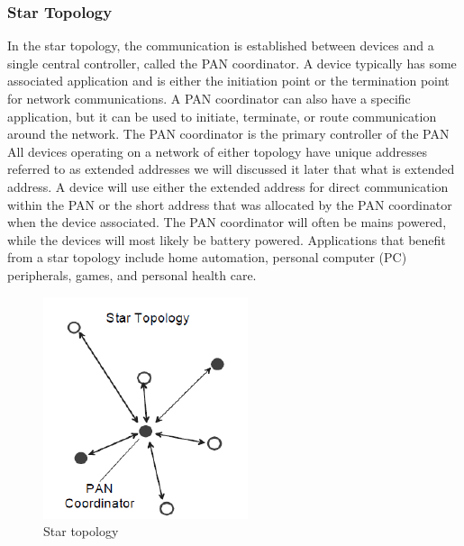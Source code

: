 \subsubsection{Star Topology}
In the star topology, the communication is established between devices and a single central controller, called the PAN coordinator. A device typically has some associated application and is either the initiation point or the termination point for network communications. A PAN coordinator can also have a specific application, but it can be used to initiate, terminate, or route communication around the network. The PAN coordinator is the primary controller of the PAN
All devices operating on a network of either topology have unique addresses referred to as extended addresses we will discussed it later that what is extended address. A device will use either the extended address for direct communication within the PAN or the short address that was allocated by the PAN coordinator when the device associated. The PAN coordinator will often be mains powered, while the devices will most likely be battery powered. Applications that benefit from a star topology include home automation, personal computer (PC) peripherals, games, and personal health care.
\begin{figure}[ht]
	\centering
	\includegraphics[scale=1.2]{images/star_topology.png}
	\caption{Star topology}
\end{figure}
